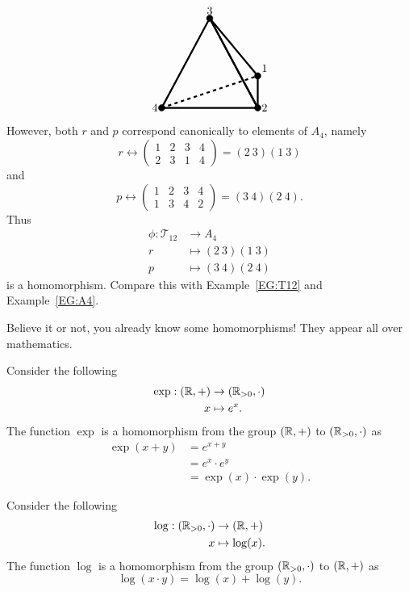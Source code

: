 \documentclass{ximera}
\begin{document}
\begin{example}
\[\begin{tikzpicture}
  \draw[ultra thick,rounded corners=.05mm] (5,0) -- (8,0) -- (6.5,2.8) -- cycle;
  \draw[ultra thick,rounded corners=.05mm] (8,1) -- (8,0) -- (6.5,2.8) -- cycle;
  \draw[ultra thick,dashed] (5,0) -- (8,1);
  \draw[fill] (8,1) circle (1mm) node[above right] {$1$};
  \draw[fill] (5,0) circle (1mm) node[left] {$4$};
  \draw[fill] (8,0) circle (1mm) node[right] {$2$};
  \draw[fill] (6.5,2.8) circle (1mm) node[above] {$3$};
\end{tikzpicture}
\]
However, both $r$ and $p$ correspond canonically to elements of $A_4$, namely
\[
r \leftrightarrow
\left(\begin{smallmatrix}
  1 & 2 & 3 & 4\\
  2 & 3 & 1 & 4
\end{smallmatrix}\right) = (2 \ 3) (1 \ 3)
\]
and
\[
p \leftrightarrow
\left(\begin{smallmatrix}
  1 & 2 & 3 & 4\\
  1 & 3 & 4 & 2
\end{smallmatrix}\right) = (3 \ 4) (2 \ 4).
\]
Thus
\begin{align*}
  \phi:\mathcal{T}_{12}&\to A_4\\
  r &\mapsto (2 \ 3) (1 \ 3)\\
  p &\mapsto (3 \ 4) (2 \ 4)
\end{align*}
is a homomorphism. Compare this with Example~\ref{EG:T12} and
Example~\ref{EG:A4}.
\end{example}




Believe it or not, you already know some homomorphisms! They appear
all over mathematics.

\begin{example}\label{EG:exp}
  Consider the following
  \begin{align*}
    \exp:(\mathbb R,+) &\to (\mathbb R_{> 0},\cdot) \\
    x &\mapsto e^x.
  \end{align*}
  The function $\exp$ is a homomorphism from the group $(\mathbb R,+)$ to
  $(\mathbb R_{> 0},\cdot)$ as
  \begin{align*}
    \exp(x+y) &= e^{x+y} \\
    &= e^x \cdot e^y\\
    &= \exp(x)\cdot \exp(y).
  \end{align*}
\end{example}



\begin{example}\label{EG:log}
  Consider the following
  \begin{align*}
    \log:(\mathbb R_{> 0},\cdot) &\to (\mathbb R,+)\\
    x &\mapsto \log(x).
  \end{align*}
  The function $\log$ is a homomorphism from the group $(\mathbb R_{> 0},\cdot)$ to $(\mathbb R,+)$ as
  \[
  \log(x\cdot y) = \log(x) + \log(y).
  \]
\end{example}
\end{document}
